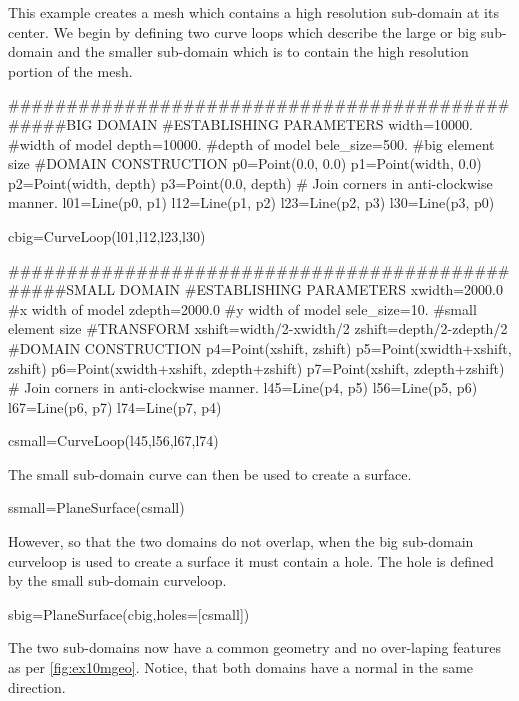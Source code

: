 This example creates a mesh which contains a high resolution sub-domain at its
center. We begin by defining two curve loops which describe the large or
big sub-domain and the smaller sub-domain which is to contain the high
resolution portion of the mesh. 
\begin{python}
################################################BIG DOMAIN
#ESTABLISHING PARAMETERS
width=10000.    #width of model
depth=10000.    #depth of model
bele_size=500.  #big element size
#DOMAIN CONSTRUCTION
p0=Point(0.0,    0.0)
p1=Point(width, 0.0)
p2=Point(width, depth)
p3=Point(0.0,   depth)
# Join corners in anti-clockwise manner.
l01=Line(p0, p1)
l12=Line(p1, p2)
l23=Line(p2, p3)
l30=Line(p3, p0)

cbig=CurveLoop(l01,l12,l23,l30)

################################################SMALL DOMAIN
#ESTABLISHING PARAMETERS
xwidth=2000.0   #x width of model
zdepth=2000.0   #y width of model
sele_size=10.   #small element size
#TRANSFORM
xshift=width/2-xwidth/2
zshift=depth/2-zdepth/2
#DOMAIN CONSTRUCTION
p4=Point(xshift, zshift)
p5=Point(xwidth+xshift, zshift)
p6=Point(xwidth+xshift, zdepth+zshift)
p7=Point(xshift,    zdepth+zshift)
# Join corners in anti-clockwise manner.
l45=Line(p4, p5)
l56=Line(p5, p6)
l67=Line(p6, p7)
l74=Line(p7, p4)

csmall=CurveLoop(l45,l56,l67,l74)
\end{python}
The small sub-domain curve can then be used to create a surface.
\begin{python}
ssmall=PlaneSurface(csmall)
\end{python}
However, so that the two domains do not overlap, when the big sub-domain
curveloop is used to create a surface it must contain a hole. The hole is
defined by the small sub-domain curveloop.
\begin{python}
sbig=PlaneSurface(cbig,holes=[csmall])
\end{python}
The two sub-domains now have a common geometry and no over-laping features as
per \autoref{fig:ex10mgeo}. Notice, that both domains have a normal in the
same direction.


